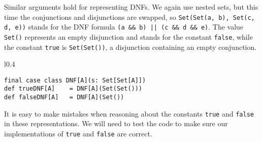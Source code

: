 Similar arguments hold for representing DNFs. We again use nested
sets, but this time the conjunctions and disjunctions are swapped,
so \lstinline!Set(Set(a, b), Set(c, d, e))! stands for the  DNF formula
\lstinline!(a && b) || (c && d && e)!. The value \lstinline!Set()!
represents an empty disjunction and stands for the constant \lstinline!false!,
while the constant \lstinline!true! is \lstinline!Set(Set())!, a
disjunction containing an empty conjunction.

\begin{wrapfigure}{l}{0.4\columnwidth}%
\vspace{-0.6\baselineskip}
\begin{lstlisting}
final case class DNF[A](s: Set[Set[A]])
def trueDNF[A]    = DNF[A](Set(Set()))
def falseDNF[A]   = DNF[A](Set())
\end{lstlisting}
\vspace{-1\baselineskip}
\end{wrapfigure}%

It is easy to make mistakes when reasoning about the constants \lstinline!true!
and \lstinline!false! in these representations. We will need to test
the code to make sure our implementations of \lstinline!true! and
\lstinline!false! are correct.

